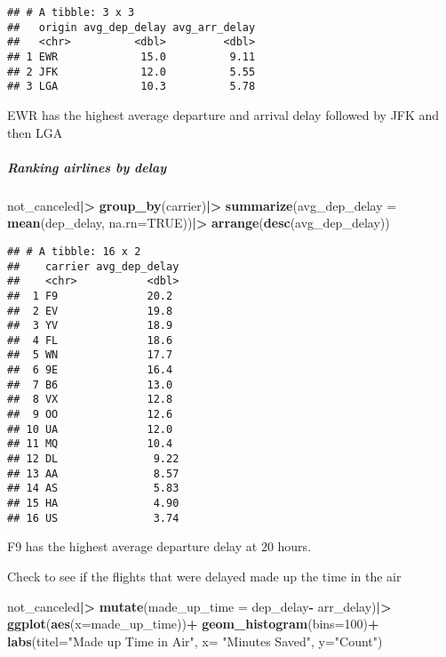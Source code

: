\documentclass[
]{article}
\newenvironment{Shaded}{\begin{snugshade}}{\end{snugshade}}
\newcommand{\AttributeTok}[1]{\textcolor[rgb]{0.13,0.29,0.53}{#1}}
\newcommand{\ConstantTok}[1]{\textcolor[rgb]{0.56,0.35,0.01}{#1}}
\newcommand{\DecValTok}[1]{\textcolor[rgb]{0.00,0.00,0.81}{#1}}
\newcommand{\FunctionTok}[1]{\textcolor[rgb]{0.13,0.29,0.53}{\textbf{#1}}}
\newcommand{\NormalTok}[1]{#1}
\newcommand{\SpecialCharTok}[1]{\textcolor[rgb]{0.81,0.36,0.00}{\textbf{#1}}}
\newcommand{\StringTok}[1]{\textcolor[rgb]{0.31,0.60,0.02}{#1}}
\begin{document}
\begin{verbatim}
## # A tibble: 3 x 3
##   origin avg_dep_delay avg_arr_delay
##   <chr>          <dbl>         <dbl>
## 1 EWR             15.0          9.11
## 2 JFK             12.0          5.55
## 3 LGA             10.3          5.78
\end{verbatim}

EWR has the highest average departure and arrival delay followed by JFK
and then LGA

\subparagraph{Ranking airlines by
delay}\label{ranking-airlines-by-delay}

\begin{Shaded}
\begin{Highlighting}[]
\NormalTok{not\_canceled}\SpecialCharTok{|\textgreater{}}
  \FunctionTok{group\_by}\NormalTok{(carrier)}\SpecialCharTok{|\textgreater{}}
  \FunctionTok{summarize}\NormalTok{(}\AttributeTok{avg\_dep\_delay =} \FunctionTok{mean}\NormalTok{(dep\_delay, }\AttributeTok{na.rn=}\ConstantTok{TRUE}\NormalTok{))}\SpecialCharTok{|\textgreater{}}
  \FunctionTok{arrange}\NormalTok{(}\FunctionTok{desc}\NormalTok{(avg\_dep\_delay))}
\end{Highlighting}
\end{Shaded}

\begin{verbatim}
## # A tibble: 16 x 2
##    carrier avg_dep_delay
##    <chr>           <dbl>
##  1 F9              20.2 
##  2 EV              19.8 
##  3 YV              18.9 
##  4 FL              18.6 
##  5 WN              17.7 
##  6 9E              16.4 
##  7 B6              13.0 
##  8 VX              12.8 
##  9 OO              12.6 
## 10 UA              12.0 
## 11 MQ              10.4 
## 12 DL               9.22
## 13 AA               8.57
## 14 AS               5.83
## 15 HA               4.90
## 16 US               3.74
\end{verbatim}

F9 has the highest average departure delay at 20 hours.

Check to see if the flights that were delayed made up the time in the
air

\begin{Shaded}
\begin{Highlighting}[]
\NormalTok{not\_canceled}\SpecialCharTok{|\textgreater{}}
  \FunctionTok{mutate}\NormalTok{(}\AttributeTok{made\_up\_time =}\NormalTok{ dep\_delay}\SpecialCharTok{{-}}\NormalTok{ arr\_delay)}\SpecialCharTok{|\textgreater{}}
  \FunctionTok{ggplot}\NormalTok{(}\FunctionTok{aes}\NormalTok{(}\AttributeTok{x=}\NormalTok{made\_up\_time))}\SpecialCharTok{+}
  \FunctionTok{geom\_histogram}\NormalTok{(}\AttributeTok{bins=}\DecValTok{100}\NormalTok{)}\SpecialCharTok{+}
  \FunctionTok{labs}\NormalTok{(}\AttributeTok{titel=}\StringTok{"Made up Time in Air"}\NormalTok{, }\AttributeTok{x=} \StringTok{"Minutes Saved"}\NormalTok{, }\AttributeTok{y=}\StringTok{"Count"}\NormalTok{)}
\end{Highlighting}
\end{Shaded}
\end{document}
